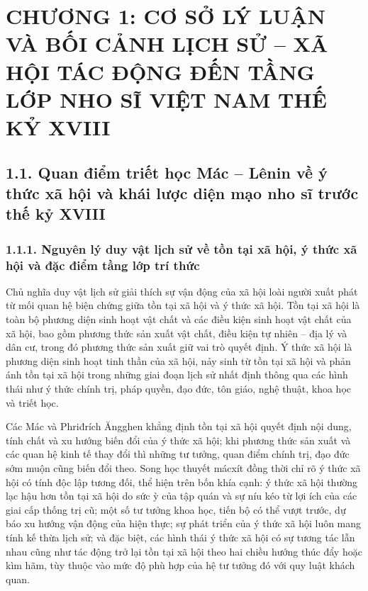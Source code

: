 \section*{CHƯƠNG 1: CƠ SỞ LÝ LUẬN VÀ BỐI CẢNH LỊCH SỬ -- XÃ HỘI TÁC ĐỘNG ĐẾN TẦNG LỚP NHO SĨ VIỆT NAM THẾ KỶ XVIII}

\subsection*{1.1. Quan điểm triết học Mác -- Lênin về ý thức xã hội và khái lược diện mạo nho sĩ trước thế kỷ XVIII}

\subsubsection*{1.1.1. Nguyên lý duy vật lịch sử về tồn tại xã hội, ý thức xã hội và đặc điểm tầng lớp trí thức}

Chủ nghĩa duy vật lịch sử giải thích sự vận động của xã hội loài người xuất phát từ mối quan hệ biện chứng giữa tồn tại xã hội và ý thức xã hội. Tồn tại xã hội là toàn bộ phương diện sinh hoạt vật chất và các điều kiện sinh hoạt vật chất của xã hội, bao gồm phương thức sản xuất vật chất, điều kiện tự nhiên -- địa lý và dân cư, trong đó phương thức sản xuất giữ vai trò quyết định. Ý thức xã hội là phương diện sinh hoạt tinh thần của xã hội, nảy sinh từ tồn tại xã hội và phản ánh tồn tại xã hội trong những giai đoạn lịch sử nhất định thông qua các hình thái như ý thức chính trị, pháp quyền, đạo đức, tôn giáo, nghệ thuật, khoa học và triết học.

Các Mác và Phriđrích Ăngghen khẳng định tồn tại xã hội quyết định nội dung, tính chất và xu hướng biến đổi của ý thức xã hội; khi phương thức sản xuất và các quan hệ kinh tế thay đổi thì những tư tưởng, quan điểm chính trị, đạo đức sớm muộn cũng biến đổi theo. Song học thuyết mácxít đồng thời chỉ rõ ý thức xã hội có tính độc lập tương đối, thể hiện trên bốn khía cạnh: ý thức xã hội thường lạc hậu hơn tồn tại xã hội do sức ỳ của tập quán và sự níu kéo từ lợi ích của các giai cấp thống trị cũ; một số tư tưởng khoa học, tiến bộ có thể vượt trước, dự báo xu hướng vận động của hiện thực; sự phát triển của ý thức xã hội luôn mang tính kế thừa lịch sử; và đặc biệt, các hình thái ý thức xã hội có sự tương tác lẫn nhau cũng như tác động trở lại tồn tại xã hội theo hai chiều hướng thúc đẩy hoặc kìm hãm, tùy thuộc vào mức độ phù hợp của hệ tư tưởng đó với quy luật khách quan.


